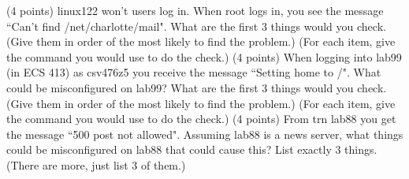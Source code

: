 \ques
(4 points)
{\ltt{}linux122} won't users log in.
When root logs in, you see the message
``{\ltt{}Can't find /net/charlotte/mail}".
What are the first 3 things would you check.
(Give them in order of the most likely to find the problem.)
(For each item, give the command you would use to do the check.)
\vskip 0.5in
\vfill
\ques
(4 points)
When logging into {\ltt{}lab99} (in ECS 413)
as {\ltt{}csv476z5} you receive the message
``Setting home to /".
What could be misconfigured on {\ltt{}lab99}?
What are the first 3 things would you check.
(Give them in order of the most likely to find the problem.)
(For each item, give the command you would use to do the check.)
\vfill
\ques
(4 points)
From {\ltt{}trn} {\ltt{}lab88} you get the message ``500 post not allowed".
Assuming {\ltt{}lab88} is a news server, what things could be misconfigured
on {\ltt{}lab88} that could cause this?
List exactly 3 things. (There are more, just list 3 of them.)
\bye
